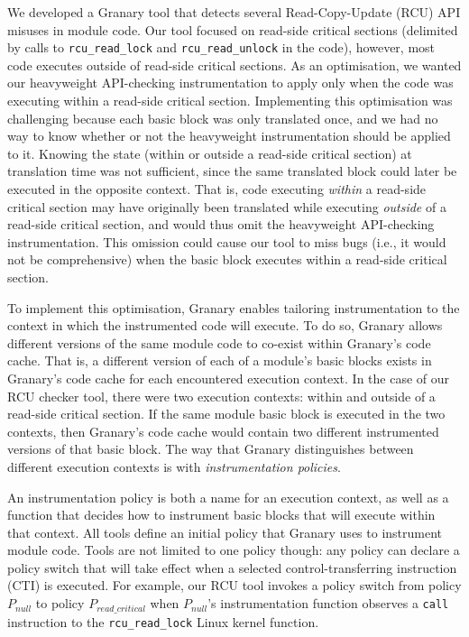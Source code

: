 \documentclass[preprint]{sigplanconf}
\begin{document}
We developed a Granary tool that detects several Read-Copy-Update (RCU) API misuses in module code. Our tool focused on read-side critical sections (delimited by calls to \texttt{rcu\_read\_lock} and \texttt{rcu\_read\_unlock} in the code), however, most code executes outside of read-side critical sections. As an optimisation, we wanted our heavyweight API-checking instrumentation to apply only when the code was executing within a read-side critical section. Implementing this optimisation was challenging because each basic block was only translated once, and we had no way to know whether or not the heavyweight instrumentation should be applied to it. Knowing the state (within or outside a read-side critical section) at translation time was not sufficient, since the same translated block could later be executed in the opposite context. That is, code executing \emph{within} a read-side critical section may have originally been translated while executing \emph{outside} of a read-side critical section, and would thus omit the heavyweight API-checking instrumentation. This omission could cause our tool to miss bugs (i.e., it would not be comprehensive) when the basic block executes within a read-side critical section.

To implement this optimisation, Granary enables tailoring instrumentation to the context in which the instrumented code will execute. To do so, Granary allows different versions of the same module code to co-exist within Granary's code cache. That is, a different version of each of a module's basic blocks exists in Granary's code cache  for each encountered execution context. In the case of our RCU checker tool, there were two execution contexts: within and outside of a read-side critical section. If the same module basic block is  executed in the two contexts, then Granary's code cache would contain two different instrumented versions of that basic block. The way that Granary distinguishes between different execution contexts is with \emph{instrumentation policies}. 

An instrumentation policy is both a name for an execution context, as well as a function that decides how to instrument basic blocks that will execute within that context. All tools define an initial policy that Granary uses to instrument module code. Tools are not limited to one policy though: any policy can declare a policy switch that will take effect when a selected control-transferring instruction (CTI) is executed. For example, our RCU tool invokes a policy switch from policy $P_{\mathit{null}}$ to policy $P_{\mathit{read\_critical}}$ when $P_{\mathit{null}}$'s instrumentation function observes a \texttt{call} instruction to the \texttt{rcu\_read\_lock} Linux kernel function.
\end{document}
